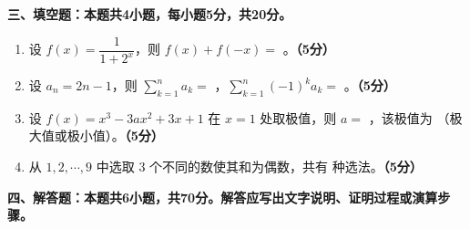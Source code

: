 \documentclass[12pt, a4paper]{ctexart}
\newcommand{\score}[1]{\hfill\textbf{（#1分）}}
\begin{document}
\vspace{10pt}

{\large\bfseries 三、填空题：本题共4小题，每小题5分，共20分。}

\vspace{8pt}

\begin{enumerate}[resume]

\item 设 $f(x)=\dfrac{1}{1+2^x}$，则 $f(x)+f(-x)=$ \underline{\hspace{2cm}}。\score{5}

\item 设 $a_n=2n-1$，则 $\displaystyle\sum_{k=1}^{n}a_k=$ \underline{\hspace{2cm}}，$\displaystyle\sum_{k=1}^{n}(-1)^ka_k=$ \underline{\hspace{2cm}}。\score{5}

\item 设 $f(x)=x^3-3ax^2+3x+1$ 在 $x=1$ 处取极值，则 $a=$ \underline{\hspace{2cm}}，该极值为 \underline{\hspace{2cm}}（极大值或极小值）。\score{5}

\item 从 $1,2,\cdots,9$ 中选取 $3$ 个不同的数使其和为偶数，共有 \underline{\hspace{2cm}} 种选法。\score{5}

\end{enumerate}

\vspace{10pt}

{\large\bfseries 四、解答题：本题共6小题，共70分。解答应写出文字说明、证明过程或演算步骤。}

\vspace{8pt}
\end{document}
